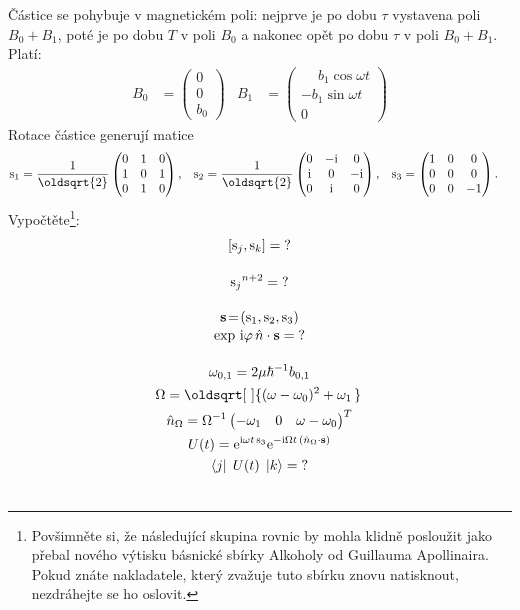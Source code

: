 \documentclass[10pt,a4paper]{article}
\renewcommand*{\sqrt}[2][\ ]{\oldsqrt[#1]{#2\,}\,}
\def\ph{\phantom}
\def\?{\mathit{?}}
\newcommand{\comm}[2]{\left[ #1, #2 \right]}
\newcommand{\const}[1]{\text{\rmfamily\upshape #1}}
\newcommand{\mat}[1]{
    \begin{pmatrix}
        #1
    \end{pmatrix}
}
\newcommand{\bra}[1]{\left< #1 \right|}
\newcommand{\ket}[1]{\left| #1 \right>}
\newcommand{\e}[1]{\const{e}^{#1}}
\renewcommand{\i}{\const{i}}
\begin{document}
Částice se pohybuje v magnetickém poli: nejprve je po dobu $\tau$ vystavena poli $B_0+B_1$, poté je po dobu $T$ v poli $B_0$ a nakonec opět po dobu $\tau$ v poli $B_0+B_1$. Platí:
\begin{align*}
    B_0 &= \mat{0 \\ 0 \\ b_0} &
    B_1 &= \mat{
        \ph{-} b_1 \cos \omega t \\
        - b_1 \sin \omega t \\
        0
    }
\end{align*}
Rotace částice generují matice
\begin{align*}
    \const{s}_1 &= \frac{1}{\oldsqrt{2}} \mat{
        0 & 1 & 0 \\
        1 & 0 & 1 \\
        0 & 1 & 0
    },
    &
    \const{s}_2 &= \frac{1}{\oldsqrt{2}} \mat{
        0 & -\i & 0 \\
        \i & 0 & -\i \\
        0 & \i & 0
    },
    &
    \const{s}_3 &= \mat{
        1 & 0 & 0 \\
        0 & 0 & 0 \\
        0 & 0 & -1
    }.
\end{align*}
Vypočtěte\footnote{Povšimněte si, že následující skupina rovnic by mohla klidně posloužit jako přebal nového výtisku básnické sbírky Alkoholy od Guillauma Apollinaira. Pokud znáte nakladatele, který zvažuje tuto sbírku znovu natisknout, nezdráhejte se ho oslovit.}:
\begin{gather*}
    \comm{\const{s}_j}{\const{s}_k} = \?
    \\[10pt]
    {\const{s}_j}^{n+2} = \?
    \\[10pt]
    \mathbf{s}
    \! = \!
    (\const{s}_1, \const{s}_2, \const{s}_3)
    \\[-2pt]
    \exp \, \i \varphi \,
    \hat{n} \cdot \mathbf{s}
    \!\, = \!\, \?
    \\[10pt]
    \omega_{0,1} = 2 \mu \hbar^{-1} b_{0,1}
    \\
    \Omega = \sqrt{(\omega-\omega_0)^2 + \omega_1}
    \\
    \hat{n}_\Omega = \Omega^{-1}
    \mat{ -\omega_1 & 0 & \omega-\omega_0 }^T
    \\
    U(t) =
    \e{\i \omega t \, \const{s}_3}
    \e{-\i \Omega t \, ( \hat{n}_\Omega \cdot \mathbf{s} )}
    \\
    \bra{j} \; U(t) \; \ket{k} = \?
    \\
    \\
\end{gather*}
\end{document}
